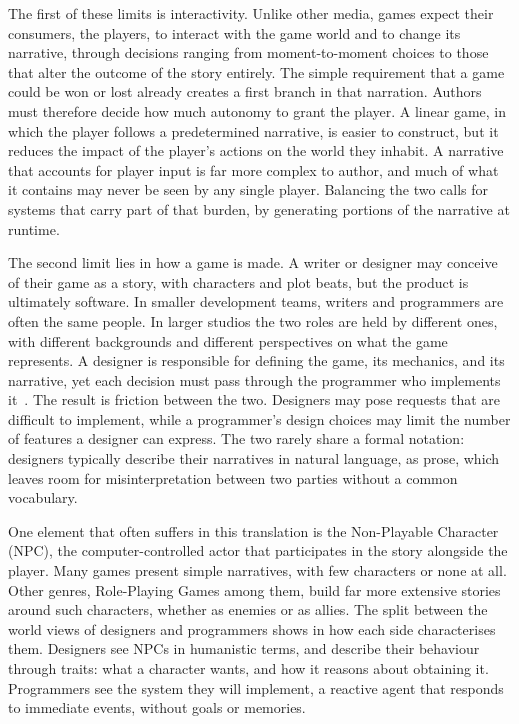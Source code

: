 The first of these limits is interactivity. Unlike other media, games expect their consumers, the players, to interact with the game world and to change its narrative, through decisions ranging from moment-to-moment choices to those that alter the outcome of the story entirely. The simple requirement that a game could be won or lost already creates a first branch in that narration. Authors must therefore decide how much autonomy to grant the player. A linear game, in which the player follows a predetermined narrative, is easier to construct, but it reduces the impact of the player's actions on the world they inhabit. A narrative that accounts for player input is far more complex to author, and much of what it contains may never be seen by any single player. Balancing the two calls for systems that carry part of that burden, by generating portions of the narrative at runtime.
 
The second limit lies in how a game is made. A writer or designer may conceive of their game as a story, with characters and plot beats, but the product is ultimately software. In smaller development teams, writers and programmers are often the same people. In larger studios the two roles are held by different ones, with different backgrounds and different perspectives on what the game represents. A designer is responsible for defining the game, its mechanics, and its narrative, yet each decision must pass through the programmer who implements it~\cite{Medler2006}. The result is friction between the two. Designers may pose requests that are difficult to implement, while a programmer's design choices may limit the number of features a designer can express. The two rarely share a formal notation: designers typically describe their narratives in natural language, as prose, which leaves room for misinterpretation between two parties without a common vocabulary.
 
One element that often suffers in this translation is the Non-Playable Character (NPC), the computer-controlled actor that participates in the story alongside the player. Many games present simple narratives, with few characters or none at all. Other genres, Role-Playing Games among them, build far more extensive stories around such characters, whether as enemies or as allies. The split between the world views of designers and programmers shows in how each side characterises them. Designers see NPCs in humanistic terms, and describe their behaviour through traits: what a character wants, and how it reasons about obtaining it. Programmers see the system they will implement, a reactive agent that responds to immediate events, without goals or memories.
 
